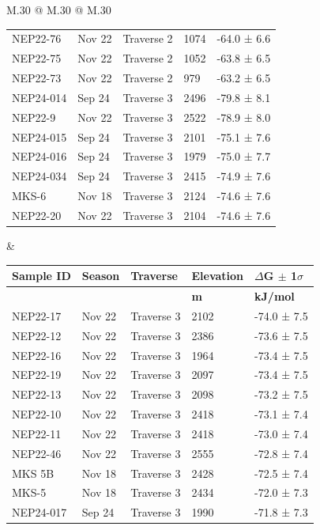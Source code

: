 \begin{landscape}
\begin{table}
\begin{tabular}{M{.30\textwidth} @{\hspace{4cm}} M{.30\textwidth} @{\hspace{4cm}} M{.30\textwidth}}
\begin{tabular}{l l l l l}
    NEP22-76 & Nov 22 & Traverse 2 & 1074 & -64.0 ±  6.6 \\
    NEP22-75 & Nov 22 & Traverse 2 & 1052 & -63.8 ±  6.5 \\
    NEP22-73 & Nov 22 & Traverse 2 & 979 & -63.2 ±  6.5 \\
    \specialrule{0.2pt}{1pt}{1pt}
    NEP24-014 & Sep 24 & Traverse 3 & 2496 & -79.8 ±  8.1 \\
    NEP22-9 & Nov 22 & Traverse 3 & 2522 & -78.9 ±  8.0 \\
    NEP24-015 & Sep 24 & Traverse 3 & 2101 & -75.1 ±  7.6 \\
    NEP24-016 & Sep 24 & Traverse 3 & 1979 & -75.0 ±  7.7 \\
    NEP24-034 & Sep 24 & Traverse 3 & 2415 & -74.9 ±  7.6 \\
    MKS-6 & Nov 18 & Traverse 3 & 2124 & -74.6 ±  7.6 \\
    NEP22-20 & Nov 22 & Traverse 3 & 2104 & -74.6 ±  7.6 \\
    \hline
        \end{tabular}
        &
        \begin{tabular}{l l l l l}
            \setlength\tabcolsep{0.1cm}
    \textbf{Sample ID}  &  \textbf{Season}  &  \textbf{Traverse}  &  \textbf{Elevation}  &  \textbf{$\Delta$G $\pm$ 1$\sigma$} \\
    \hline
    &   &   &  \textbf{m}  &  \textbf{kJ/mol} \\
    \hline
    NEP22-17 & Nov 22 & Traverse 3 & 2102 & -74.0 ±  7.5 \\
    NEP22-12 & Nov 22 & Traverse 3 & 2386 & -73.6 ±  7.5 \\
    NEP22-16 & Nov 22 & Traverse 3 & 1964 & -73.4 ±  7.5 \\
    NEP22-19 & Nov 22 & Traverse 3 & 2097 & -73.4 ±  7.5 \\
    NEP22-13 & Nov 22 & Traverse 3 & 2098 & -73.2 ±  7.5 \\
    NEP22-10 & Nov 22 & Traverse 3 & 2418 & -73.1 ±  7.4 \\
    NEP22-11 & Nov 22 & Traverse 3 & 2418 & -73.0 ±  7.4 \\
    NEP22-46 & Nov 22 & Traverse 3 & 2555 & -72.8 ±  7.4 \\
    MKS 5B & Nov 18 & Traverse 3 & 2428 & -72.5 ±  7.4 \\
    MKS-5 & Nov 18 & Traverse 3 & 2434 & -72.0 ±  7.3 \\
    NEP24-017 & Sep 24 & Traverse 3 & 1990 & -71.8 ±  7.3 \\

\end{tabular}
\end{tabular}
\end{table}
\end{landscape}
